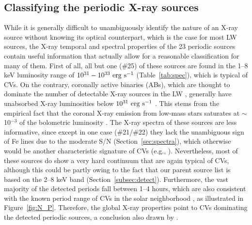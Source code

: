 \documentclass[fleqn,usenatbib]{mnras}
\begin{document}
\subsection{Classifying the periodic X-ray sources}
\label{subsec:class}
While it is generally difficult to unambiguously identify the nature of an X-ray source without knowing its optical counterpart, which is the case for most LW sources, the X-ray temporal and spectral properties of the 23 periodic sources contain useful information that actually allow for a reasonable classification for many of them. 
First of all, all but one (\#25) of these sources are found in the 1--8 keV luminosity range of $10^{31}-10^{33}\rm~erg~s^{-1}$ (Table~\ref{tab:spec}), which is typical of CVs. 
On the contrary, coronally active binaries (ABs), which are thought to dominate the number of detectable X-ray sources in the LW \citep{2009Natur.458.1142R}, generally have unabsorbed X-ray luminosities below $\rm 10^{31}~erg~s^{-1}$ \citep{2006A&A...450..117S}. 
This stems from the empirical fact that the coronal X-ray emission from low-mass stars saturates at $\sim$10$^{-3}$ of the bolometric luminosity \citep{2004A&ARv..12...71G}.
The X-ray spectra of these sources are less informative, since except in one case (\#21/\#22) they lack the unambiguous sign of Fe lines due to the moderate S/N (Section~\ref{sec:spectra}), which otherwise would be another characteristic signature of CVs (e.g., \citealp{2016ApJ...818..136X}).
Nevertheless, most of these sources do show a very hard continuum that are again typical of CVs, although this could be partly owing to the fact that our parent source list is based on the 2--8 keV band (Section~\ref{subsec:detect}).
Furthermore, the vast majority of the detected periods fall between 1--4 hours, which are also consistent with the known period range of CVs in the solar neighborhood \citep{2003A&A...404..301R}, as illustrated in Figure~\ref{fig:N_P}.
Therefore, the global X-ray properties point to CVs dominating the detected periodic sources, a conclusion also drawn by \cite{2012ApJ...746..165H}.
\end{document}

